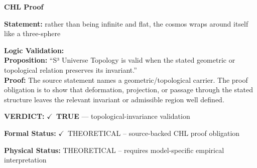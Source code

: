 \vspace{0.45em}
\noindent\textbf{CHL Proof}\par
\textbf{Statement:} rather than being infinite and flat, the cosmos wraps around itself like a three-sphere

\textbf{Logic Validation:}\\
\textbf{Proposition:} ``S³ Universe Topology is valid when the stated geometric or topological relation
preserves its invariant.''\\
\textbf{Proof:} The source statement names a geometric/topological carrier. The proof obligation is to
show that deformation, projection, or passage through the stated structure leaves the
relevant invariant or admissible region well defined.

\textbf{VERDICT:} \ensuremath{\checkmark}\ \textbf{TRUE} --- topological-invariance validation

\textbf{Formal Status:} \ensuremath{\checkmark}\ THEORETICAL -- source-backed CHL proof obligation

\textbf{Physical Status:} THEORETICAL -- requires model-specific empirical interpretation
\par\vspace{0.45em}
\par
\ifTZPDarkEdition
{}
\fi
\endgroup
\endgroup
